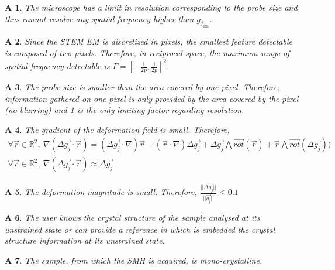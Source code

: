 \documentclass[12pt]{article}
\newtheorem{A}{A}
\begin{document}
\begin{A}
\normalfont The microscope has a limit in resolution corresponding to the probe 
size and thus cannot resolve any spatial frequency higher than 
$g_{j_{\text{lim}}}$. 
\label{A_1}
\end{A}
\begin{A}
\normalfont Since the STEM EM is discretized in pixels, the smallest feature 
detectable is composed of two pixels. Therefore, in reciprocal space, the 
maximum range of spatial frequency detectable is 
$\Gamma=[-\frac{1}{2p},\frac{1}{2p}]^{2}$.
\label{A_2}
\end{A}
\begin{A}
\normalfont The probe size is smaller than the area covered by one pixel. 
Therefore, information gathered on one pixel is only provided by the area 
covered by the pixel (no blurring) and \cref{A_1} is the only limiting factor 
regarding resolution.
\label{A_3}
\end{A}
\begin{A}
\label{A_4}
\normalfont The gradient of the deformation field is small. Therefore,
\begin{equation*}
\begin{gathered}
\forall \vec{r} \in \mathbb{R}^2, \ \nabla 
(\Delta\overrightarrow{g_j}\cdot\vec{r})= 
(\Delta\overrightarrow{g_j}\cdot\nabla)\vec{r}+(\vec{r}\cdot\nabla)\Delta\overrightarrow{g_j}+\Delta\overrightarrow{g_j}\bigwedge 
\overrightarrow{\mathit{rot}}(\vec{r})+\vec{r}\bigwedge 
\overrightarrow{\mathit{rot}}(\Delta\overrightarrow{g_j}))\\
\forall \vec{r} \in \mathbb{R}^2, \ \nabla 
(\Delta\overrightarrow{g_j}\cdot\vec{r})\approx \Delta\overrightarrow{g_j}
\end{gathered}
\end{equation*}
\end{A}
\begin{A}
\label{A_5}
\normalfont The deformation magnitude is small. Therefore, 
$\frac{||\Delta\overrightarrow{g_j} ||}{||\overrightarrow{g_j} ||}\leq 0.1$
\end{A}
\begin{A}
\label{A_6}
\normalfont The user knows the crystal structure of the sample analysed at its 
unstrained state or can provide a reference in which is embedded the crystal 
structure information at its unstrained state.
\end{A}
\begin{A}
\label{A_7}
\normalfont The sample, from which the SMH is acquired, is mono-crystalline.
\end{A}
\end{document}
